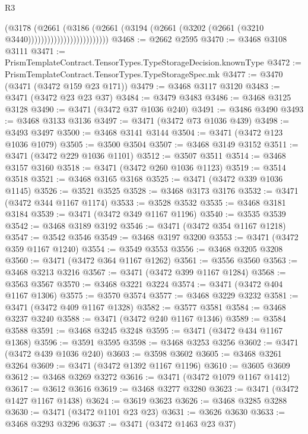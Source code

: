 \begin{lexlean}{R3}
\begin{coremodule}
                                    (@3178
                                      (@2661
                                        (@3186
                                          (@2661
                                            (@3194
                                              (@2661
                                                (@3202 (@2661 (@3210 @3440)))))))))))))))))))))))))
@3468 := @2662 @2595
@3470 := @3468 @3108 @3111
@3471 := PrismTemplateContract.TensorTypes.TypeStorageDecision.knownType
@3472 := PrismTemplateContract.TensorTypes.TypeStorageSpec.mk
@3477 := @3470 (@3471 (@3472 @159 @23 @171))
@3479 := @3468 @3117 @3120
@3483 := @3471 (@3472 @23 @23 @37)
@3484 := @3479 @3483
@3486 := @3468 @3125 @3128
@3490 := @3471 (@3472 @37 @1036 @240)
@3491 := @3486 @3490
@3493 := @3468 @3133 @3136
@3497 := @3471 (@3472 @73 @1036 @439)
@3498 := @3493 @3497
@3500 := @3468 @3141 @3144
@3504 := @3471 (@3472 @123 @1036 @1079)
@3505 := @3500 @3504
@3507 := @3468 @3149 @3152
@3511 := @3471 (@3472 @229 @1036 @1101)
@3512 := @3507 @3511
@3514 := @3468 @3157 @3160
@3518 := @3471 (@3472 @260 @1036 @1123)
@3519 := @3514 @3518
@3521 := @3468 @3165 @3168
@3525 := @3471 (@3472 @339 @1036 @1145)
@3526 := @3521 @3525
@3528 := @3468 @3173 @3176
@3532 := @3471 (@3472 @344 @1167 @1174)
@3533 := @3528 @3532
@3535 := @3468 @3181 @3184
@3539 := @3471 (@3472 @349 @1167 @1196)
@3540 := @3535 @3539
@3542 := @3468 @3189 @3192
@3546 := @3471 (@3472 @354 @1167 @1218)
@3547 := @3542 @3546
@3549 := @3468 @3197 @3200
@3553 := @3471 (@3472 @359 @1167 @1240)
@3554 := @3549 @3553
@3556 := @3468 @3205 @3208
@3560 := @3471 (@3472 @364 @1167 @1262)
@3561 := @3556 @3560
@3563 := @3468 @3213 @3216
@3567 := @3471 (@3472 @399 @1167 @1284)
@3568 := @3563 @3567
@3570 := @3468 @3221 @3224
@3574 := @3471 (@3472 @404 @1167 @1306)
@3575 := @3570 @3574
@3577 := @3468 @3229 @3232
@3581 := @3471 (@3472 @409 @1167 @1328)
@3582 := @3577 @3581
@3584 := @3468 @3237 @3240
@3588 := @3471 (@3472 @240 @1167 @1346)
@3589 := @3584 @3588
@3591 := @3468 @3245 @3248
@3595 := @3471 (@3472 @434 @1167 @1368)
@3596 := @3591 @3595
@3598 := @3468 @3253 @3256
@3602 := @3471 (@3472 @439 @1036 @240)
@3603 := @3598 @3602
@3605 := @3468 @3261 @3264
@3609 := @3471 (@3472 @1392 @1167 @1196)
@3610 := @3605 @3609
@3612 := @3468 @3269 @3272
@3616 := @3471 (@3472 @1079 @1167 @1412)
@3617 := @3612 @3616
@3619 := @3468 @3277 @3280
@3623 := @3471 (@3472 @1427 @1167 @1438)
@3624 := @3619 @3623
@3626 := @3468 @3285 @3288
@3630 := @3471 (@3472 @1101 @23 @23)
@3631 := @3626 @3630
@3633 := @3468 @3293 @3296
@3637 := @3471 (@3472 @1463 @23 @37)

\end{coremodule}
\end{lexlean}
